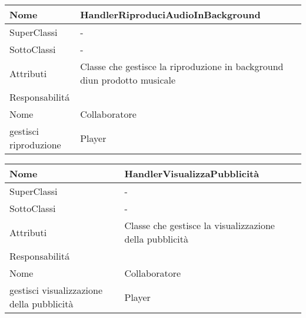 \begin{center}
    \begin{tabular}{ |p{3cm}|p{3cm}|p{3cm}|p{3cm}| }
        \hline
        Nome & \multicolumn{3}{|p{9cm}|}{HandlerRiproduciAudioInBackground} \\\hline
        SuperClassi & \multicolumn{3}{|p{9cm}|}{-} \\\hline
        SottoClassi & \multicolumn{3}{|p{9cm}|}{-} \\\hline
        Attributi & \multicolumn{3}{|p{9cm}|}{Classe che gestisce la riproduzione in background diun prodotto musicale} \\\hline
        \multicolumn{4}{|p{12cm}|}{Responsabilit\'a} \\\hline
        \multicolumn{2}{|p{6cm}|}{Nome} & \multicolumn{2}{|p{6cm}|}{Collaboratore} \\\hline
        \multicolumn{2}{|p{6cm}|}{gestisci riproduzione} & \multicolumn{2}{|p{6cm}|}{Player} \\\hline
    \end{tabular}
\end{center}

\begin{center}
    \begin{tabular}{ |p{3cm}|p{3cm}|p{3cm}|p{3cm}| }
        \hline
        Nome & \multicolumn{3}{|p{9cm}|}{HandlerVisualizzaPubblicità} \\\hline
        SuperClassi & \multicolumn{3}{|p{9cm}|}{-} \\\hline
        SottoClassi & \multicolumn{3}{|p{9cm}|}{-} \\\hline
        Attributi & \multicolumn{3}{|p{9cm}|}{Classe che gestisce la visualizzazione della pubblicità} \\\hline
        \multicolumn{4}{|p{12cm}|}{Responsabilit\'a} \\\hline
        \multicolumn{2}{|p{6cm}|}{Nome} & \multicolumn{2}{|p{6cm}|}{Collaboratore} \\\hline
        \multicolumn{2}{|p{6cm}|}{gestisci visualizzazione della pubblicità} & \multicolumn{2}{|p{6cm}|}{Player} \\\hline
    \end{tabular}
\end{center}

